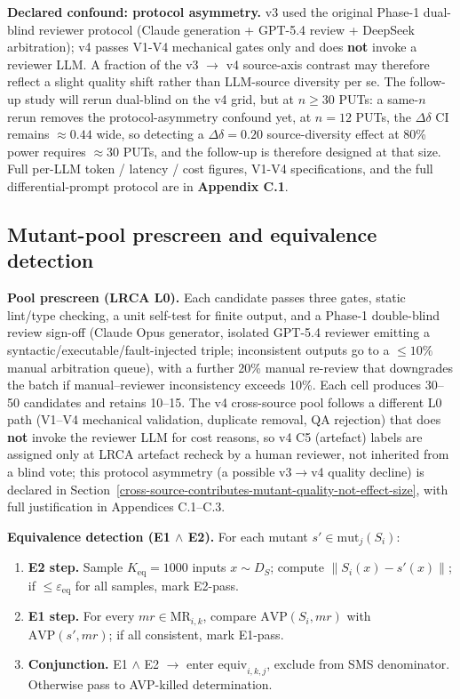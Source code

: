 \documentclass[manuscript,screen,review]{acmart}
\begin{document}
\textbf{Declared confound: protocol asymmetry.} v3 used the
original Phase-1 dual-blind reviewer protocol (Claude generation +
GPT-5.4 review + DeepSeek arbitration); v4 passes V1-V4 mechanical gates
only and does \textbf{not} invoke a reviewer LLM. A fraction of the v3 $\to$
v4 source-axis contrast may therefore reflect a slight quality shift
rather than LLM-source diversity per se. The follow-up study will rerun
dual-blind on the v4 grid, but at $n \geq 30$ PUTs: a same-$n$ rerun
removes the protocol-asymmetry confound yet, at $n = 12$ PUTs, the
$\Delta\delta$ CI remains $\approx 0.44$ wide, so detecting a
$\Delta\delta = 0.20$ source-diversity effect at 80\% power requires
$\approx 30$ PUTs, and the follow-up is therefore designed at that size.
Full per-LLM token / latency / cost figures,
V1-V4 specifications, and the full differential-prompt protocol are in
\textbf{Appendix C.1}.

\subsection{Mutant-pool prescreen and equivalence detection}\label{mutant-pool-prescreen-and-equivalence-detection}

\textbf{Pool prescreen (LRCA L0).} Each candidate passes three gates, static
lint/type checking, a unit self-test for finite output, and a Phase-1
double-blind review sign-off (Claude Opus generator, isolated GPT-5.4 reviewer
emitting a syntactic/executable/fault-injected triple; inconsistent outputs go
to a $\leq 10\%$ manual arbitration queue), with a further 20\% manual re-review
that downgrades the batch if manual--reviewer inconsistency exceeds 10\%. Each
cell produces 30--50 candidates and retains 10--15. The v4 cross-source pool
follows a different L0 path (V1--V4 mechanical validation, duplicate removal, QA
rejection) that does \textbf{not} invoke the reviewer LLM for cost reasons, so v4
C5 (artefact) labels are assigned only at LRCA artefact recheck by a human
reviewer, not inherited from a blind vote; this protocol asymmetry (a possible
v3$\to$v4 quality decline) is declared in
Section~\ref{cross-source-contributes-mutant-quality-not-effect-size}, with full
justification in Appendices C.1--C.3.

\textbf{Equivalence detection (E1 $\wedge$ E2).} For each mutant
$s' \in \mathrm{mut}_j(S_i)$:

\begin{enumerate}

\item
  \textbf{E2 step.} Sample $K_{\mathrm{eq}} = 1000$ inputs
  $x \sim D_S$; compute
  $\|S_i(x) - s'(x)\|$; if $\leq \varepsilon_{\mathrm{eq}}$ for all
  samples, mark E2-pass.
\item
  \textbf{E1 step.} For every $mr \in \mathrm{MR}_{i,k}$, compare
  $\mathrm{AVP}(S_i, mr)$ with $\mathrm{AVP}(s', mr)$;
  if all consistent, mark E1-pass.
\item
  \textbf{Conjunction.} E1 $\wedge$ E2 $\to$ enter $\mathrm{equiv}_{i,k,j}$,
  exclude from SMS denominator. Otherwise pass to AVP-killed
  determination.
\end{enumerate}
\end{document}
